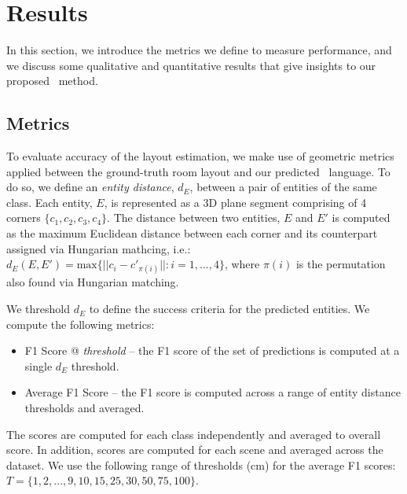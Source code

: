 \section{Results}
\label{section:experiments}

In this section, we introduce the metrics we define to measure performance, and we discuss some qualitative and quantitative results that give insights to our proposed \METHOD~method. 




\subsection{Metrics}
To evaluate accuracy of the layout estimation, we make use of geometric metrics applied between the ground-truth room layout and our predicted \METHOD~language. To do so, we define an \textit{entity distance}, $d_E$, between a pair of entities of the same class. Each entity, $E$, is represented as a 3D plane segment comprising of 4 corners $\{c_1, c_2, c_3, c_4\}$. The distance between two entities, $E$ and $E'$ is computed as the maximum Euclidean distance between each corner and its counterpart assigned via Hungarian mathcing, i.e.: $d_E(E, E') = \text{max}\{||c_i - c'_{\pi(i)}|| : i = 1, ..., 4\}$, where $\pi(i)$ is the permutation also found via Hungarian matching. 

We threshold $d_E$ to define the success criteria for the predicted entities. We compute the following metrics: 
\begin{itemize}
    \item F1 Score @ \textit{threshold} -- the F1 score of the set of predictions is computed at a single $d_E$ threshold.
    \item Average F1 Score -- the F1 score is computed across a range of entity distance thresholds and averaged.
\end{itemize}

The scores are computed for each class independently and averaged to overall score. In addition, scores are computed for each scene and averaged across the dataset. We use the following range of thresholds (cm) for the average F1 scores: $T = \{1, 2, ..., 9, 10, 15, 25, 30, 50, 75, 100\}$.


